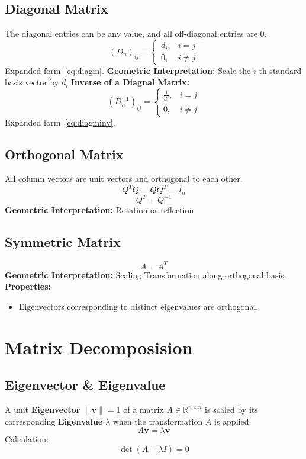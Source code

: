\documentclass{article}
\begin{document}
\subsection{Diagonal Matrix}
The diagonal entries can be any value, and all off-diagonal entries are 0.
\[
    (D_n)_{ij} =
    \begin{cases}
        d_i, & i = j \\
        0, & i \neq j
    \end{cases}
\]
Expanded form~\ref{eq:diagm}.
\newline
\textbf{Geometric Interpretation:} Scale the $i$-th standard basis vector by $d_i$
\newline
\textbf{Inverse of a Diagnal Matrix:}
\[
    (D_n^{-1})_{ij} =
    \begin{cases}
        \frac{1}{d_i}, & i = j \\
        0, & i \neq j
    \end{cases}
\]
Expanded form~\ref{eq:diagminv}.

\subsection{Orthogonal Matrix}
All column vectors are unit vectors and orthogonal to each other.
\[
    Q^T Q = Q Q^T = I_n
\]
\[
    Q^T = Q^{-1}
\]
\textbf{Geometric Interpretation:} Rotation or reflection

\subsection{Symmetric Matrix}
\[
    A = A^T
\]
\textbf{Geometric Interpretation:} Scaling Transformation along orthogonal basis.
\newline
\textbf{Properties:}
\begin{itemize}
    \item Eigenvectors corresponding to distinct eigenvalues are orthogonal.
\end{itemize}


\newpage
\section{Matrix Decomposision}

\subsection{Eigenvector \& Eigenvalue}

A unit \textbf{Eigenvector} $\|\mathbf{v}\| = 1$ of a matrix $A \in \mathbb{R}^{n \times n}$ is scaled by its corresponding \textbf{Eigenvalue} $\lambda$ when the transformation $A$ is applied.
\[
    A\mathbf{v} = \lambda \mathbf{v}
\]
Calculation:
\[
    \det(A - \lambda I) = 0
\]
\end{document}
